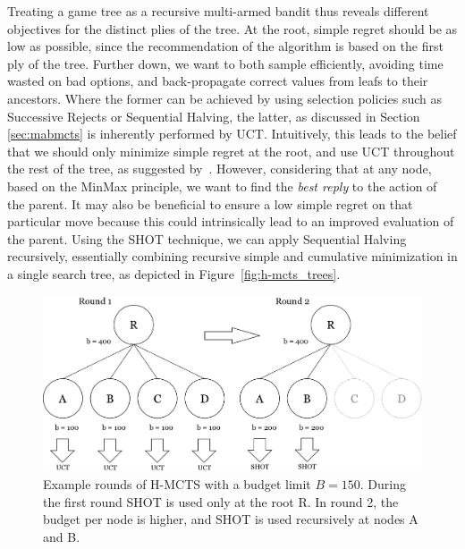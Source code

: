 \documentclass{kecsmstr}
\begin{document}
Treating a game tree as a recursive multi-armed bandit thus reveals different objectives for the distinct plies of the tree. At the root, simple regret should be as low as possible, since the recommendation of the algorithm is based on the first ply of the tree. Further down, we want to both sample efficiently, avoiding time wasted on bad options, and back-propagate correct values from leafs to their ancestors. Where the former can be achieved by using selection policies such as Successive Rejects or Sequential Halving, the latter, as discussed in Section \ref{sec:mabmcts} is inherently performed by UCT. Intuitively, this leads to the belief that we should only minimize simple regret at the root, and use UCT throughout the rest of the tree, as suggested by~. 
However, considering that at any node, based on the MinMax principle, we want to find the \emph{best reply} to the action of the parent. It may also be beneficial to ensure a low simple regret on that particular move because this could intrinsically lead to an improved evaluation of the parent. Using the SHOT technique, we can apply Sequential Halving recursively, essentially combining recursive simple and cumulative minimization in a single search tree, as depicted in Figure~\ref{fig:h-mcts_trees}.

\begin{figure}[ht]
	\centering
	\includegraphics[width=.75\textwidth]{img/H-MCTS_Rounds.png}
	\caption[Hybrid MCTS example rounds]{Example rounds of H-MCTS with a budget limit $B = 150$. During the first round SHOT is used only at the root R. In round 2, the budget per node is higher, and SHOT is used recursively at nodes A and B.}
	\label{fig:h-mcts_rounds}
\end{figure}
\end{document}
